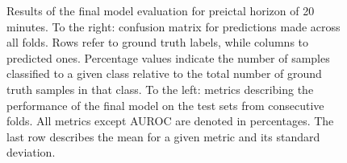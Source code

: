\documentclass[a4paper,fleqn]{cas-sc}
\begin{document}
\begin{figure}[hbt]
\begin{minipage}[t]{0.55\textwidth}
    \label{tab:metrics-lookback-1200}
  \end{minipage}
  
  \addtocounter{figure}{-1}
    \captionsetup{labelformat=andtable}
    \caption{Results of the final model evaluation for preictal horizon of 20 minutes. To the right: confusion matrix for predictions made across all folds. Rows refer to ground truth labels, while columns to predicted ones. Percentage values indicate the number of samples classified to a given class relative to the total number of ground truth samples in that class. To the left: metrics describing the performance of the final model on the test sets from consecutive folds. All metrics except AUROC are denoted in percentages. The last row describes the mean for a given metric and its standard deviation.}
\end{figure}
\FloatBarrier
\end{document}
